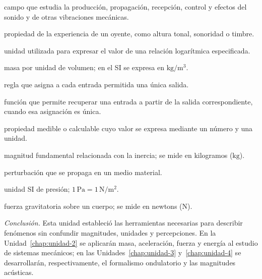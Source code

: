 \begin{description}[nosep]
    \item[\textbf{Acústica:}] campo que estudia la producción, propagación, recepción, control y efectos del sonido y de otras vibraciones mecánicas.
    \item[\textbf{Atributo perceptual:}] propiedad de la experiencia de un oyente, como altura tonal, sonoridad o timbre.
    \item[\textbf{Decibel (\(\text{dB}\)):}] unidad utilizada para expresar el valor de una relación logarítmica especificada.
    \item[\textbf{Densidad (\(\rho\)):}] masa por unidad de volumen; en el SI se expresa en \(\text{kg}/\text{m}^{3}\).
    \item[\textbf{Función:}] regla que asigna a cada entrada permitida una única salida.
    \item[\textbf{Función inversa:}] función que permite recuperar una entrada a partir de la salida correspondiente, cuando esa asignación es única.
    \item[\textbf{Magnitud física:}] propiedad medible o calculable cuyo valor se expresa mediante un número y una unidad.
    \item[\textbf{Masa:}] magnitud fundamental relacionada con la inercia; se mide en kilogramos (\(\text{kg}\)).
    \item[\textbf{Onda mecánica:}] perturbación que se propaga en un medio material.
    \item[\textbf{Pascal (\(\text{Pa}\)):}] unidad SI de presión; \(1\,\text{Pa}=1\,\text{N}/\text{m}^{2}\).
    \item[\textbf{Peso:}] fuerza gravitatoria sobre un cuerpo; se mide en newtons (\(\text{N}\)).
\end{description}

\bigskip
\noindent\emph{Conclusión.} Esta unidad estableció las herramientas necesarias para describir fenómenos sin confundir magnitudes, unidades y percepciones. En la Unidad~\ref{chap:unidad-2} se aplicarán masa, aceleración, fuerza y energía al estudio de sistemas mecánicos; en las Unidades~\ref{chap:unidad-3} y~\ref{chap:unidad-4} se desarrollarán, respectivamente, el formalismo ondulatorio y las magnitudes acústicas.

